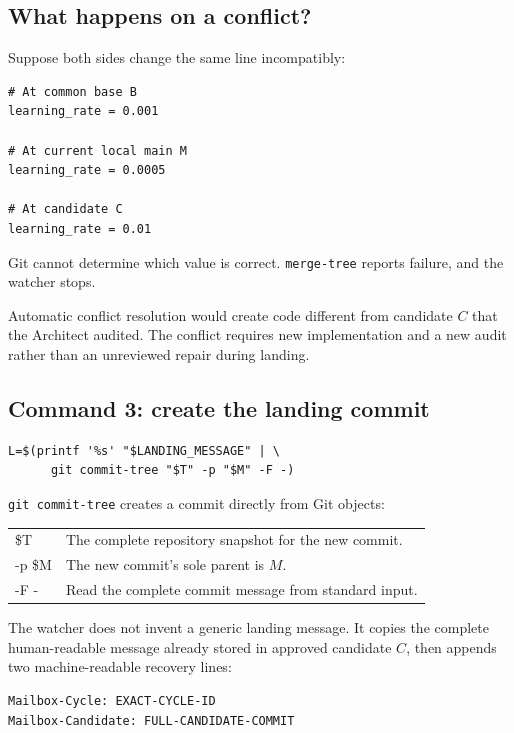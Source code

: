 \documentclass[10pt,twocolumn]{article}
\newcommand{\code}[1]{\texttt{#1}}
\begin{document}
\subsection{What happens on a conflict?}

Suppose both sides change the same line incompatibly:

\begin{lstlisting}
# At common base B
learning_rate = 0.001

# At current local main M
learning_rate = 0.0005

# At candidate C
learning_rate = 0.01
\end{lstlisting}

Git cannot determine which value is correct. \code{merge-tree} reports
failure, and the watcher stops.

\begin{stopbox}
Automatic conflict resolution would create code different from candidate $C$
that the Architect audited. The conflict requires new implementation and a
new audit rather than an unreviewed repair during landing.
\end{stopbox}

\subsection{Command 3: create the landing commit}

\begin{lstlisting}
L=$(printf '%s' "$LANDING_MESSAGE" | \
      git commit-tree "$T" -p "$M" -F -)
\end{lstlisting}

\code{git commit-tree} creates a commit directly from Git objects:

\begin{tabularx}{\columnwidth}{>{\ttfamily}p{} X}
\$T & The complete repository snapshot for the new commit.\\
-p \$M & The new commit's sole parent is $M$.\\
-F - & Read the complete commit message from standard input.\\
\end{tabularx}

The watcher does not invent a generic landing message. It copies the complete
human-readable message already stored in approved candidate $C$, then appends
two machine-readable recovery lines:

\begin{lstlisting}
Mailbox-Cycle: EXACT-CYCLE-ID
Mailbox-Candidate: FULL-CANDIDATE-COMMIT
\end{lstlisting}
\end{document}
